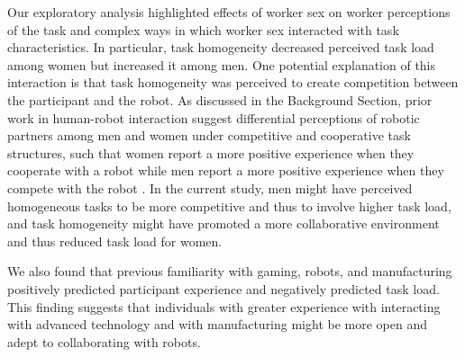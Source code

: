 Our exploratory analysis highlighted effects of worker sex on worker perceptions of the task and complex ways in which worker sex interacted with task characteristics. In particular, task homogeneity decreased perceived task load among women but increased it among men. One potential explanation of this interaction is that task homogeneity was  perceived to create competition between the participant and the robot. As discussed in the Background Section, prior work in human-robot interaction suggest differential perceptions of robotic partners among men and women under competitive and cooperative task structures, such that women report a more positive experience when they cooperate with a robot while men report a more positive experience when they compete with the robot \cite{mutlu2006task}. In the current study, men might have perceived homogeneous tasks to be more competitive and thus to involve higher task load, and task homogeneity might have promoted a more collaborative environment and thus reduced task load for women.

We also found that previous familiarity with gaming, robots, and manufacturing positively predicted participant experience and negatively predicted task load. This finding suggests that individuals with greater experience with interacting with advanced technology and with manufacturing might be more open and adept to collaborating with robots. 